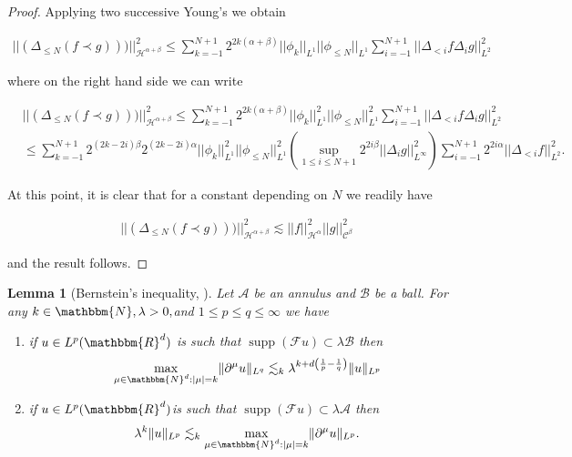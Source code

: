 \documentclass[11pt, oneside]{article}   	%
\newcommand{\tmop}[1]{\ensuremath{\operatorname{#1}}}
\newtheorem{lemma}[theorem]{Lemma}
\newcommand{\CC}{\mathscr{C}}
\newcommand{\ssp}{\mathscr{H}}
\begin{document}
\begin{proof}
	Applying two successive Young's we obtain
	
	\begin{align*}
	|| \left(\Delta_{\leq N} (f\prec g)\right))
	||_{\ssp^{\alpha+ \beta}}^2 \leq  \sum_{k=-1}^{N+1} 2^{2k(\alpha+\beta)} ||\phi_k||_{L^1} || \phi_{\leq N}||_{L^1}    \sum_{i=-1}^{N+1} ||\Delta_{<i} f \Delta_i g||_{L^2}^2
	\end{align*}
	
	where on the right hand side we can write
	
	\begin{align*}
	& || \left(\Delta_{\leq N} (f\prec g)\right))
	||_{\ssp^{\alpha+ \beta}}^2 \leq  \sum_{k=-1}^{N+1} 2^{2k(\alpha+\beta)} ||\phi_k||_{L^1}^2 || \phi_{\leq N}||_{L^1}^2    \sum_{i=-1}^{N+1} ||\Delta_{<i} f \Delta_i g||_{L^2}^2\\
	&\leq \sum_{k=-1}^{N+1} 2^{(2k-2i)\beta} 2^{(2k-2i)\alpha}||\phi_k||_{L^1}^2 || \phi_{\leq N}||_{L^1}^2    \left( \sup_{1\leq i \leq N+1}2^{2 i \beta}||\Delta_i g||_{L^\infty}^2 \right) \sum_{i=-1}^{N+1} 2^{2i\alpha} ||\Delta_{<i} f||_{L^2}^2.
	\end{align*}
	
	At this point, it is clear that for a constant depending on $N$ we readily have
	
	\begin{align*}
	|| \left(\Delta_{\leq N} (f\prec g)\right))
	||_{\ssp^{\alpha+ \beta}}^2 \lesssim || f
	||_{\ssp^{\alpha}}^2 || g ||_{\CC^{\beta}}^2
	\end{align*}
	
and the result follows.
	
	
	
	
	\end{proof}

\begin{lemma}[Bernstein's inequality, \cite{gubinelli2015paracontrolled}]
	\label{lem:bernstein}Let $\mathscr{A}$ be an annulus and $\mathscr{B}$ be a
	ball. For any $k \in \mathbbm{N}, \lambda > 0,$and $1 \le p \le
	q \le \infty$ we have
	\begin{enumerate}
		\item if $u \in L^p (\mathbbm{R}^d) $ is such that $\tmop{supp}
		(\mathscr{F}u) \subset \lambda \mathscr{B}$ then
		\[ \underset{\mu \in \mathbbm{N}^d : | \mu | = k}{\max} \| \partial^{\mu}
		u \|_{L^q} \lesssim_k \lambda^{k + d \left( \frac{1}{p} - \frac{1}{q}
			\right)} \| u \|_{L^p} \]
		\item if $u \in L^p (\mathbbm{R}^d) $is such that $\tmop{supp}
		(\mathscr{F}u) \subset \lambda \mathscr{A}$ then
		\[ \lambda^k \| u \|_{L^p} \lesssim_k \underset{\mu \in \mathbbm{N}^d : |
			\mu | = k}{\max} \| \partial^{\mu} u \|_{L^p} . \]
	\end{enumerate}
\end{lemma}
\end{document}
